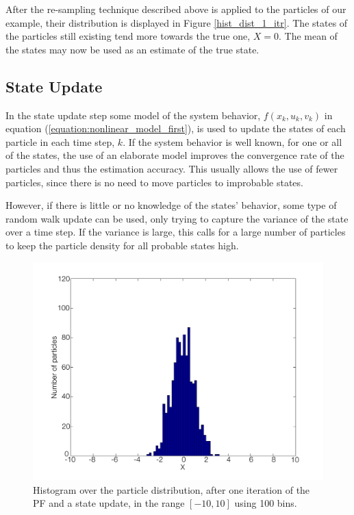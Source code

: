 \documentclass{LTHthesis}
\begin{document}
After the re-sampling technique described above is applied to the particles of our example, their distribution is displayed in Figure \ref{hist_dist_1_itr}. The states of the particles still existing tend more towards the true one, $X=0$. The mean of the states may now be used as an estimate of the true state.    
% 
\subsection{State Update}
%
In the state update step some model of the system behavior, $f(x_k,u_k,v_k)$ in equation (\ref{equation:nonlinear_model_first}), is used to update the states of each particle in each time step, $k$. If the system behavior is well known, for one or all of the states, the use  of an elaborate model improves the convergence rate of the particles and thus the estimation accuracy. This usually allows the use of fewer particles, since there is no need to move particles to improbable states.

However, if there is little or no knowledge of the states' behavior, some type of random walk update can be used, only trying to capture the variance of the state over a time step. If the variance is large, this calls for a large number of particles to keep the particle density for all probable states high. 
%
\begin{figure}[!hbt]

\includegraphics[width=1\textwidth ]{images/PF/hist_dist_1_itr_dyn}
\caption{Histogram over the particle distribution, after one iteration of the PF and a state update, in the range $[-10,10]$ using 100 bins.}\label{hist_dist_1_itr_dyn}
\end{figure}
\end{document}

